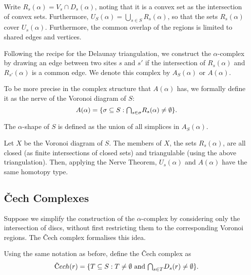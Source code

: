 Write $R_s(\alpha) = V_s \cap D_s(\alpha)$, noting that it is a convex set as the intersection of convex sets. Furthermore, $U_S(\alpha) = \bigcup_{s \in S} R_s(\alpha)$, so that the sets $R_s(\alpha)$ cover $U_s(\alpha)$. Furthermore, the common overlap of the regions is limited to shared edges and vertices.

Following the recipe for the Delaunay triangulation, we construct the $\alpha$-complex by drawing an edge between two sites $s$ and $s'$ if the intersection of $R_s(\alpha)$ and $R_{s'}(\alpha)$ is a common edge. We denote this complex by $A_S(\alpha)$ or $A(\alpha)$.

\begin{definition}
To be more precise in the complex structure that $A(\alpha)$ has, we formally define it as the nerve of the Voronoi diagram of $S$:
$$
A(\alpha) = \{\sigma \subseteq S : \mathsmaller{\bigcap}_{s \in \sigma}R_s(\alpha) \not= \emptyset\}.
$$
\end{definition}

\begin{definition}
The $\alpha$-shape of $S$ is defined as the union of all simplices in $A_{S}(\alpha)$.
\end{definition}

Let $X$ be the Voronoi diagram of $S$. The members of $X$, the sets $R_s(\alpha)$, are all closed (as finite intersections of closed sets) and triangulable (using the above triangulation). Then, applying the Nerve Theorem, $U_s(\alpha)$ and $A(\alpha)$ have the same homotopy type.


\subsection{\v{C}ech Complexes}

Suppose we simplify the construction of the $\alpha$-complex by considering only the intersection of discs, without first restricting them to the corresponding Voronoi regions. The \v{C}ech complex formalises this idea.

\begin{definition}
Using the same notation as before, define the \v{C}ech complex as
$$
\text{\v{C}}ech(r) = \{T \subseteq S : T \not= \emptyset \text{ and } \mathsmaller{\bigcap}_{s \in T} D_s(r) \not = \emptyset\}.
$$
\end{definition}

